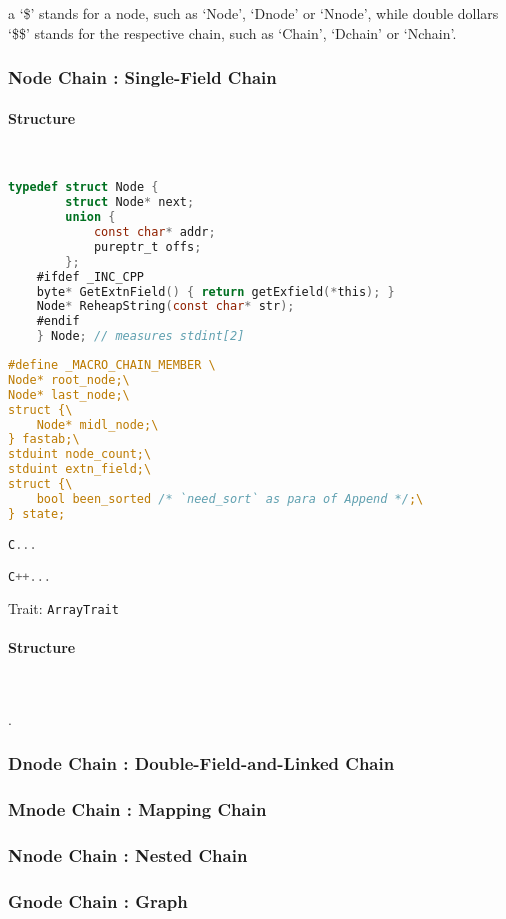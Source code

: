 a `\$' stands for a node, such as `Node', `Dnode' or `Nnode', while double dollars `\$\$' stands for the respective chain, such as `Chain', `Dchain' or `Nchain'.

\subsubsection{Node Chain : Single-Field Chain}

\paragraph{Structure} \

\lstset{style=GlobalC}
\begin{lstlisting}[language=C]
	typedef struct Node {
		struct Node* next;
		union {
			const char* addr;
			pureptr_t offs;
		};
	#ifdef _INC_CPP
	byte* GetExtnField() { return getExfield(*this); }
	Node* ReheapString(const char* str);
	#endif
	} Node; // measures stdint[2]
\end{lstlisting}

\lstset{style=GlobalC}
\begin{lstlisting}[language=C]
#define _MACRO_CHAIN_MEMBER \
Node* root_node;\
Node* last_node;\
struct {\
	Node* midl_node;\
} fastab;\
stduint node_count;\
stduint extn_field;\
struct {\
	bool been_sorted /* `need_sort` as para of Append */;\
} state;

C...

C++...

\end{lstlisting}
Trait:  \verb|ArrayTrait|

\paragraph{Structure} \

.

\subsubsection{Dnode Chain : Double-Field-and-Linked Chain}

\subsubsection{Mnode Chain : Mapping Chain}

\subsubsection{Nnode Chain : Nested Chain}

\subsubsection{Gnode Chain : Graph}


